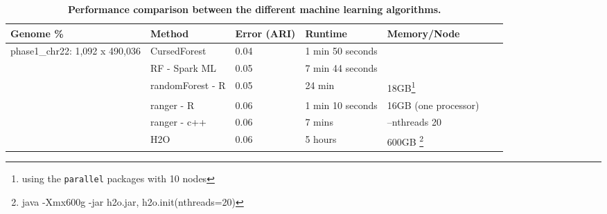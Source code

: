 \documentclass[11pt]{article}
\newcommand{\cursedforest}{{\sc CursedForest}}
\begin{document}
\begin{sidewaystable}[!ht]
\begin{minipage}{\textwidth}
\centering
\caption{
{\bf Performance comparison between the different machine learning algorithms.}}
\begin{tabular}{|l|l|l|l|l|l|p{1cm}|}
\hline
\bf{Genome \%}                      & \bf{Method} & \bf{Error (ARI)} & \bf{Runtime} & \bf{Memory/Node} \\
\hline

\multirow{3}{*}{phase1\_chr22: 1,092 x 490,036} & \cursedforest & 0.04  & 1 min 50 seconds  &  \\ %
                                                & RF - Spark ML  &  0.05           &           7 min 44 seconds        &  \\  %
                                                & randomForest - R         & 0.05       & 24 min           & 18GB\footnote{using the \texttt{parallel} packages with 10 nodes} \\ %
                                                & ranger - R      & 0.06       & 1 min 10 seconds & 16GB  (one processor)                                             \\ %
                                                & ranger - c++     & 0.06       & 7 mins           & --nthreads 20                                                    \\  %
                                                & H2O           & 0.06       & 5 hours         & 600GB \footnote{java -Xmx600g -jar h2o.jar,   h2o.init(nthreads=20)} \\ %


\end{tabular}
\end{minipage}
\end{sidewaystable}
\end{document}
